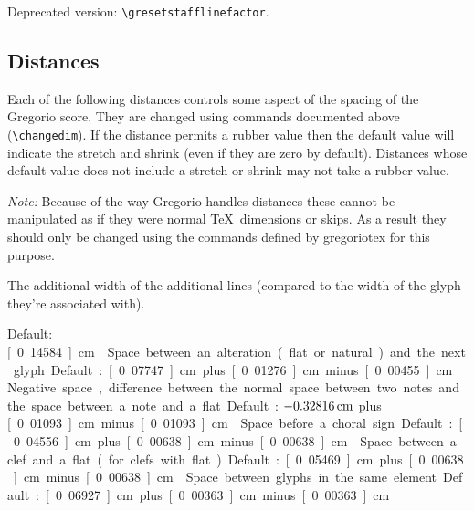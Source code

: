 Deprecated version: \verb=\gresetstafflinefactor=.




\subsection{Distances}\label{distances}

Each of the following distances controls some aspect of the spacing of the Gregorio score.  They are changed using commands documented above (\eg \verb=\changedim=).  If the distance permits a rubber value then the default value will indicate the stretch and shrink (even if they are zero by default).  Distances whose default value does not include a stretch or shrink may not take a rubber value.

\emph{Note:} Because of the way Gregorio handles distances these cannot be manipulated as if they were normal \TeX\ dimensions or skips.  As a result they should only be changed using the commands defined by gregoriotex for this purpose.

The additional width of the additional lines (compared to the width of the glyph they're associated with).  

Default: \unit[0.14584]{cm}

Space between an alteration (flat or natural) and the next glyph. 

Default: \unit[0.07747]{cm} plus \unit[0.01276]{cm} minus \unit[0.00455]{cm}

Negative space, difference between the normal space between two notes and the space between a note and a flat.  

Default: $\unit[-0.32816]{cm}$ plus \unit[0.01093]{cm} minus \unit[0.01093]{cm}

Space before a choral sign. 

Default: \unit[0.04556]{cm} plus \unit[0.00638]{cm} minus \unit[0.00638]{cm}

Space between a clef and a flat (for clefs with flat).  

Default: \unit[0.05469]{cm} plus \unit[0.00638]{cm} minus \unit[0.00638]{cm}

Space between glyphs in the same element. 

Default: \unit[0.06927]{cm} plus \unit[0.00363]{cm} minus \unit[0.00363]{cm}

